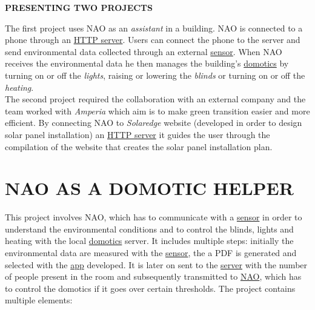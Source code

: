 \documentclass{optica-article}
\begin{document}
\begin{abstract*}
\bigskip

\noindent
\textbf{PRESENTING TWO PROJECTS}

\bigskip
\noindent
The first project uses NAO as an \emph{assistant} in a building. NAO is connected to a phone through an \hyperref[sec:domotics_server]{HTTP server}. Users can connect the phone to the server and send environmental data collected through an external \hyperref[sec:domotics_sensor]{sensor}. When NAO receives the environmental data he then manages the building's \hyperref[sec:domotics_domotics_server]{domotics} by turning on or off the \emph{lights}, raising or lowering the \emph{blinds} or turning on or off the \emph{heating}.\\


\vspace{7pt}
\noindent
The second project required the collaboration with an external company and the team worked with \emph{Amperia} which aim is to make green transition easier and more efficient. By connecting NAO to \emph{Solaredge} website (developed in order to design solar panel installation) an \hyperref[sec:solaedge_server]{HTTP server} it guides the user through the compilation of the website that creates the solar panel installation plan.\\

\end{abstract*}


\section{NAO AS A DOMOTIC HELPER}\label{sec:domotics_project}

This project involves NAO, which has to communicate with a \hyperref[sec:domotics_sensor]{sensor} in order to understand the environmental conditions and to control the blinds, lights and heating with the local \hyperref[sec:domotics_domotics_server]{domotics} server. It includes multiple steps: initially the environmental data are measured with the \hyperref[sec:domotics_sensor]{sensor}, the a PDF is generated and selected with the \hyperref[sec:domotics_app]{app} developed. It is later on sent to the \hyperref[sec:domotics_server]{server} with the number of people present in the room and subsequently transmitted to \hyperref[sec:domotics_nao]{NAO}, which has to control the domotics if it goes over certain thresholds. The project contains multiple elements:\\
\end{document}
